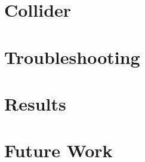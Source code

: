 \documentclass[11pt, conference]{IEEEtran}
\begin{document}
	\section{Collider}\label{sec:collider}
	


	\section{Troubleshooting}\label{sec:troubleshooting}
	
	
	\section{Results}\label{sec:results}
	
	
	\section{Future Work}\label{sec:future_work}
	
	
\end{document}
